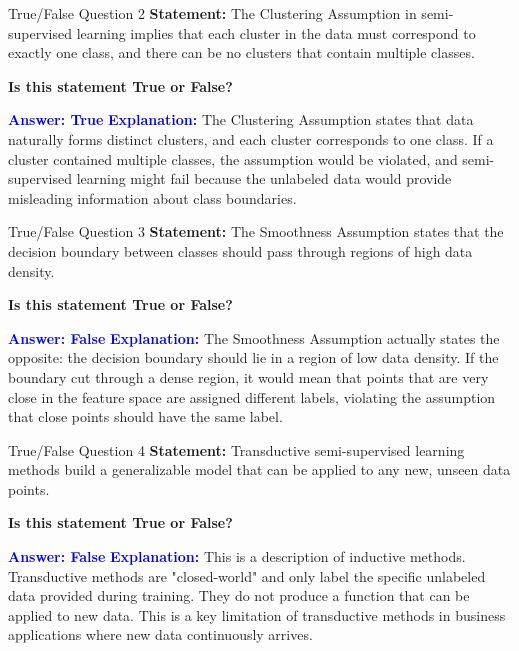 \documentclass[8pt]{beamer}  %
\begin{document}
	\begin{frame}{True/False Question 2}
		\textbf{Statement:} The Clustering Assumption in semi-supervised learning implies that each cluster in the data must correspond to exactly one class, and there can be no clusters that contain multiple classes.
		
		\vspace{0.3cm}
		\textbf{Is this statement True or False?}
		
		\vspace{0.2cm}
		\textcolor{blue}{\textbf{Answer: True}}
		\vspace{0.2cm}
		\textcolor{blue}{\textbf{Explanation:}} The Clustering Assumption states that data naturally forms distinct clusters, and each cluster corresponds to one class. If a cluster contained multiple classes, the assumption would be violated, and semi-supervised learning might fail because the unlabeled data would provide misleading information about class boundaries.
	\end{frame}
	
	\begin{frame}{True/False Question 3}
		\textbf{Statement:} The Smoothness Assumption states that the decision boundary between classes should pass through regions of high data density.
		
		\vspace{0.3cm}
		\textbf{Is this statement True or False?}
		
		\vspace{0.2cm}
		\textcolor{blue}{\textbf{Answer: False}}
		\vspace{0.2cm}
		\textcolor{blue}{\textbf{Explanation:}} The Smoothness Assumption actually states the opposite: the decision boundary should lie in a region of low data density. If the boundary cut through a dense region, it would mean that points that are very close in the feature space are assigned different labels, violating the assumption that close points should have the same label.
	\end{frame}
	
	\begin{frame}{True/False Question 4}
		\textbf{Statement:} Transductive semi-supervised learning methods build a generalizable model that can be applied to any new, unseen data points.
		
		\vspace{0.3cm}
		\textbf{Is this statement True or False?}
		
		\vspace{0.2cm}
		\textcolor{blue}{\textbf{Answer: False}}
		\vspace{0.2cm}
		\textcolor{blue}{\textbf{Explanation:}} This is a description of inductive methods. Transductive methods are "closed-world" and only label the specific unlabeled data provided during training. They do not produce a function that can be applied to new data. This is a key limitation of transductive methods in business applications where new data continuously arrives.
	\end{frame}
	
\end{document}
